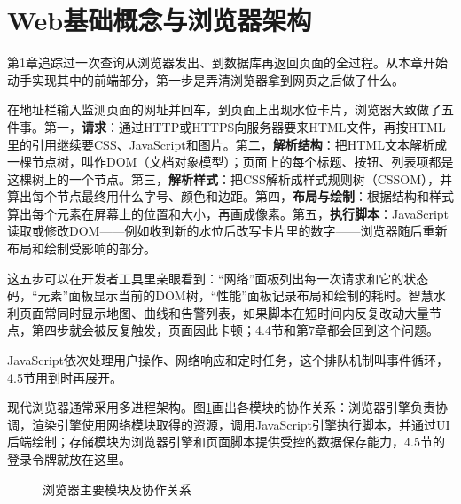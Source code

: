 \section{Web基础概念与浏览器架构}

第1章追踪过一次查询从浏览器发出、到数据库再返回页面的全过程。从本章开始动手实现其中的前端部分，第一步是弄清浏览器拿到网页之后做了什么。

在地址栏输入监测页面的网址并回车，到页面上出现水位卡片，浏览器大致做了五件事。第一，\textbf{请求}：通过HTTP或HTTPS向服务器要来HTML文件，再按HTML里的引用继续要CSS、JavaScript和图片。第二，\textbf{解析结构}：把HTML文本解析成一棵节点树，叫作DOM（文档对象模型）；页面上的每个标题、按钮、列表项都是这棵树上的一个节点。第三，\textbf{解析样式}：把CSS解析成样式规则树（CSSOM），并算出每个节点最终用什么字号、颜色和边距。第四，\textbf{布局与绘制}：根据结构和样式算出每个元素在屏幕上的位置和大小，再画成像素。第五，\textbf{执行脚本}：JavaScript读取或修改DOM——例如收到新的水位后改写卡片里的数字——浏览器随后重新布局和绘制受影响的部分。

这五步可以在开发者工具里亲眼看到：“网络”面板列出每一次请求和它的状态码，“元素”面板显示当前的DOM树，“性能”面板记录布局和绘制的耗时。智慧水利页面常同时显示地图、曲线和告警列表，如果脚本在短时间内反复改动大量节点，第四步就会被反复触发，页面因此卡顿；4.4节和第7章都会回到这个问题。

JavaScript依次处理用户操作、网络响应和定时任务，这个排队机制叫事件循环，4.5节用到时再展开。

现代浏览器通常采用多进程架构。图\ref{fig:browser-architecture}画出各模块的协作关系：浏览器引擎负责协调，渲染引擎使用网络模块取得的资源，调用JavaScript引擎执行脚本，并通过UI后端绘制；存储模块为浏览器引擎和页面脚本提供受控的数据保存能力，4.5节的登录令牌就放在这里。

\begin{figure}[htbp]
\centering
{}
\caption{浏览器主要模块及协作关系}
\label{fig:browser-architecture}
\end{figure}

